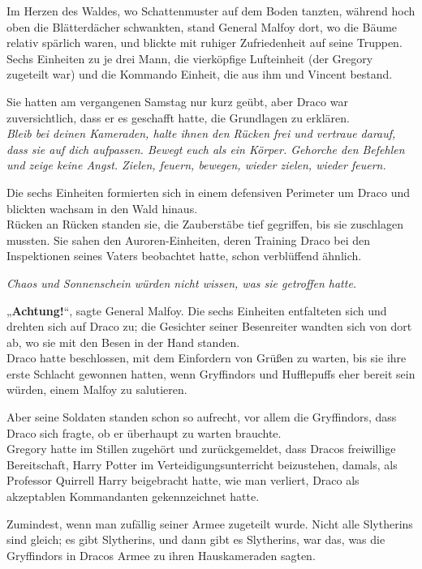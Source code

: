 {Im Herzen des Waldes, wo Schattenmuster auf dem Boden tanzten, während hoch oben die Blätterdächer schwankten, stand General Malfoy dort, wo die Bäume relativ spärlich waren, und blickte mit ruhiger Zufriedenheit auf seine Truppen.\\ Sechs Einheiten zu je drei Mann, die vierköpfige Lufteinheit (der Gregory zugeteilt war) und die Kommando Einheit, die aus ihm und Vincent bestand.

Sie hatten am vergangenen Samstag nur kurz geübt, aber Draco war zuversichtlich, dass er es geschafft hatte, die Grundlagen zu erklären.\\ \emph{Bleib bei deinen Kameraden, halte ihnen den Rücken frei und vertraue darauf, dass sie auf dich aufpassen. Bewegt euch als ein Körper. Gehorche den Befehlen und zeige keine Angst. Zielen, feuern, bewegen, wieder zielen, wieder feuern.}

Die sechs Einheiten formierten sich in einem defensiven Perimeter um Draco und blickten wachsam in den Wald hinaus.\\ Rücken an Rücken standen sie, die Zauberstäbe tief gegriffen, bis sie zuschlagen mussten. Sie sahen den Auroren-Einheiten, deren Training Draco bei den Inspektionen seines Vaters beobachtet hatte, schon verblüffend ähnlich.

\emph{Chaos und Sonnenschein würden nicht wissen, was sie getroffen hatte.}

„\textbf{Achtung!}“, sagte General Malfoy. Die sechs Einheiten entfalteten sich und drehten sich auf Draco zu; die Gesichter seiner Besenreiter wandten sich von dort ab, wo sie mit den Besen in der Hand standen.\\ Draco hatte beschlossen, mit dem Einfordern von Grüßen zu warten, bis sie ihre erste Schlacht gewonnen hatten, wenn Gryffindors und Hufflepuffs eher bereit sein würden, einem Malfoy zu salutieren.

Aber seine Soldaten standen schon so aufrecht, vor allem die Gryffindors, dass Draco sich fragte, ob er überhaupt zu warten brauchte.\\ Gregory hatte im Stillen zugehört und zurückgemeldet, dass Dracos freiwillige Bereitschaft, Harry Potter im Verteidigungsunterricht beizustehen, damals, als Professor Quirrell Harry beigebracht hatte, wie man verliert, Draco als akzeptablen Kommandanten gekennzeichnet hatte.

Zumindest, wenn man zufällig seiner Armee zugeteilt wurde. Nicht alle Slytherins sind gleich; es gibt Slytherins, und dann gibt es Slytherins, war das, was die Gryffindors in Dracos Armee zu ihren Hauskameraden sagten.

}
